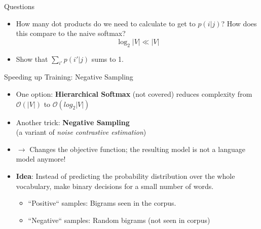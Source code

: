 \documentclass[11pt,compress,t,notes=noshow, xcolor=table]{beamer}
\begin{document}

\begin{vbframe}{Questions}

\vfill

\begin{itemize}
	\item \ques How many dot products do we need to calculate to get to $p(i|j)$? How does this compare to the naive softmax?
		 $$\log_2|V| \ll |V|$$

	\vskip5mm
	\item \ques Show that $\sum_{i'} p(i'|j)$ sums to 1.
\end{itemize}

\vfill

\end{vbframe}

\fi


\begin{vbframe}{Speeding up Training: Negative Sampling}

\vfill

\begin{itemize}
	\item One option: \textbf{Hierarchical Softmax} (not covered) reduces complexity from $\mathcal{O}(|V|)$ to $\mathcal{O}(log_2|V|)$
	\item Another trick: \textbf{Negative Sampling}\\ (a variant of \emph{noise contrastive estimation})
	\item[] $\to$ Changes the objective function; the resulting model is not a language model anymore!
	\item \textbf{Idea}: Instead of predicting the probability distribution over the whole vocabulary, make binary decisions for a small number of words.
			\begin{itemize}
				\item ``Positive`` samples: Bigrams seen in the corpus.
				\item ``Negative`` samples: Random bigrams (not seen in corpus)
			\end{itemize}
\end{itemize}

\vfill

\end{vbframe}

\end{document}
